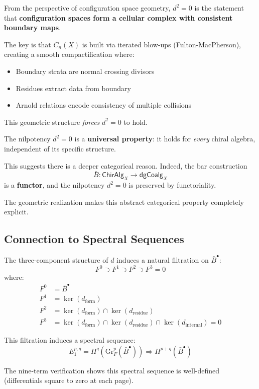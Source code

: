 \begin{perspective}\label{persp:kontsevich-geometry}
From the perspective of configuration space geometry, $d^2 = 0$ is the statement that
\textbf{configuration spaces form a cellular complex with consistent boundary maps}.

The key is that $\overline{C}_n(X)$ is built via iterated blow-ups (Fulton-MacPherson),
creating a smooth compactification where:
\begin{itemize}
\item Boundary strata are normal crossing divisors
\item Residues extract data from boundary
\item Arnold relations encode consistency of multiple collisions
\end{itemize}

This geometric structure \emph{forces} $d^2 = 0$ to hold.
\end{perspective}

\begin{perspective}\label{persp:grothendieck-functorial}
The nilpotency $d^2 = 0$ is a \textbf{universal property}: it holds for \emph{every}
chiral algebra, independent of its specific structure.

This suggests there is a deeper categorical reason. Indeed, the bar construction
$$\bar{B}: \mathsf{ChirAlg}_X \to \mathsf{dgCoalg}_X$$
is a \textbf{functor}, and the nilpotency $d^2 = 0$ is preserved by functoriality.

The geometric realization makes this abstract categorical property completely explicit.
\end{perspective}

\subsection{Connection to Spectral Sequences}

\begin{remark}
The three-component structure of $d$ induces a natural filtration on $\bar{B}^{\bullet}$:
$$F^0 \supset F^1 \supset F^2 \supset F^3 = 0$$
where:
\begin{align*}
F^0 &= \bar{B}^{\bullet}\\
F^1 &= \ker(d_{\text{form}})\\
F^2 &= \ker(d_{\text{form}}) \cap \ker(d_{\text{residue}})\\
F^3 &= \ker(d_{\text{form}}) \cap \ker(d_{\text{residue}}) \cap \ker(d_{\text{internal}}) = 0
\end{align*}

This filtration induces a spectral sequence:
$$E_1^{p,q} = H^q(\text{Gr}^p_F(\bar{B}^{\bullet})) \Rightarrow H^{p+q}(\bar{B}^{\bullet})$$

The nine-term verification shows this spectral sequence is well-defined (differentials
square to zero at each page).
\end{remark}

